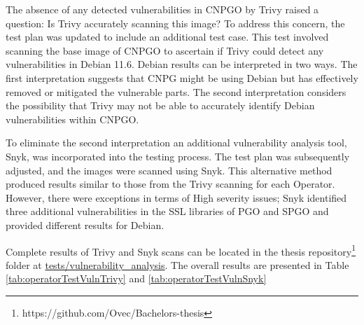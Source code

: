 The absence of any detected vulnerabilities in CNPGO by Trivy raised a question: Is Trivy accurately scanning this image? To address this concern, the test plan was updated to include an additional test case. This test involved scanning the base image of CNPGO to ascertain if Trivy could detect any vulnerabilities in Debian 11.6.
Debian results can be interpreted in two ways. The first interpretation suggests that CNPG might be using Debian but has effectively removed or mitigated the vulnerable parts. The second interpretation considers the possibility that Trivy may not be able to accurately identify Debian vulnerabilities within CNPGO.

To eliminate the second interpretation an additional vulnerability analysis tool, Snyk, was incorporated into the testing process. The test plan was subsequently adjusted, and the images were scanned using Snyk. This alternative method produced results similar to those from the Trivy scanning for each Operator. However, there were exceptions in terms of High severity issues; Snyk identified three additional vulnerabilities in the SSL libraries of PGO and SPGO and provided different results for Debian.

Complete results of Trivy and Snyk scans can be located in the thesis repository\footnote[6]{https://github.com/Ovec/Bachelors-thesis} folder at \url{tests/vulnerability_analysis}. The overall results are presented in Table \ref{tab:operatorTestVulnTrivy} and \ref{tab:operatorTestVulnSnyk}



